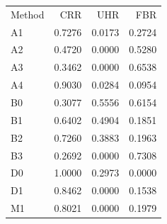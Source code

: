 \begin{tabular}{lrrr}
Method & CRR & UHR & FBR \\
A1 & 0.7276 & 0.0173 & 0.2724 \\
A2 & 0.4720 & 0.0000 & 0.5280 \\
A3 & 0.3462 & 0.0000 & 0.6538 \\
A4 & 0.9030 & 0.0284 & 0.0954 \\
B0 & 0.3077 & 0.5556 & 0.6154 \\
B1 & 0.6402 & 0.4904 & 0.1851 \\
B2 & 0.7260 & 0.3883 & 0.1963 \\
B3 & 0.2692 & 0.0000 & 0.7308 \\
D0 & 1.0000 & 0.2973 & 0.0000 \\
D1 & 0.8462 & 0.0000 & 0.1538 \\
M1 & 0.8021 & 0.0000 & 0.1979 \\
\end{tabular}
